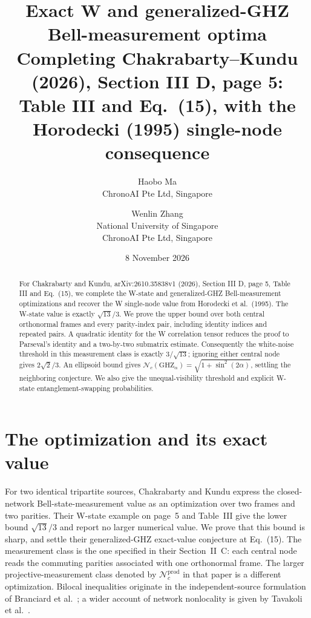 \documentclass[11pt,a4paper]{article}
\title{Exact W and generalized-GHZ Bell-measurement optima\\
\large Completing Chakrabarty--Kundu (2026), Section III D, page 5:\\
Table III and Eq.~(15), with the Horodecki (1995) single-node consequence}
\author{Haobo Ma\\\small ChronoAI Pte Ltd, Singapore
\and Wenlin Zhang\\\small National University of Singapore\\
\small ChronoAI Pte Ltd, Singapore}
\date{8 November 2026}
\begin{document}
\maketitle
\begin{abstract}
For Chakrabarty and Kundu, arXiv:2610.35838v1 (2026), Section III D,
page 5, Table III and Eq.~(15), we complete the W-state and generalized-GHZ
Bell-measurement optimizations and recover the W single-node value from
Horodecki et al.~(1995). The W-state value is exactly
$\sqrt{13}/3$. We prove the upper bound over both central orthonormal
frames and every parity-index pair, including identity indices and repeated
pairs. A quadratic identity for the W correlation tensor reduces the proof
to Parseval's identity and a two-by-two submatrix estimate. Consequently the
white-noise threshold in this measurement class is exactly $3/\sqrt{13}$;
ignoring either central node gives $2\sqrt2/3$. An ellipsoid bound gives
$\mathcal N_c(\mathrm{GHZ}_\alpha)=\sqrt{1+\sin^2(2\alpha)}$,
settling the neighboring conjecture. We also give the unequal-visibility
threshold and explicit W-state entanglement-swapping probabilities.
\end{abstract}

\section{The optimization and its exact value}
For two identical tripartite sources, Chakrabarty and Kundu
\cite[Proposition 1, Eqs.~(10)--(12)]{CK} express the closed-network
Bell-state-measurement value as an optimization over two frames and two
parities. Their W-state example on page~5 and Table~III give the lower bound
$\sqrt{13}/3$ and report no larger numerical value. We prove that this bound
is sharp, and settle their generalized-GHZ exact-value conjecture at
Eq.~(15). The measurement class is the one specified in their Section~II~C:
each central node reads the commuting parities associated with one
orthonormal frame. The larger projective-measurement class denoted by
$\mathcal N_c^{\mathrm{prod}}$ in that paper is a different optimization.
Bilocal inequalities originate in the independent-source formulation of
Branciard et al.~\cite{BRGP}; a wider account of network nonlocality is
given by Tavakoli et al.~\cite{TPRL}.
\end{document}
